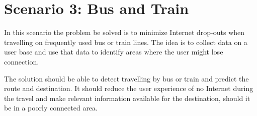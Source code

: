 \section{Scenario 3: Bus and Train}
In this scenario the problem be solved is to minimize Internet drop-outs when travelling on frequently used bus or train lines. The idea is to collect data on a user base and use that data to identify areas where the user might lose connection.

The solution should be able to detect travelling by bus or train and predict the route and destination. It should reduce the user experience of no Internet during the travel and make relevant information available for the destination, should it be in a poorly connected area.

